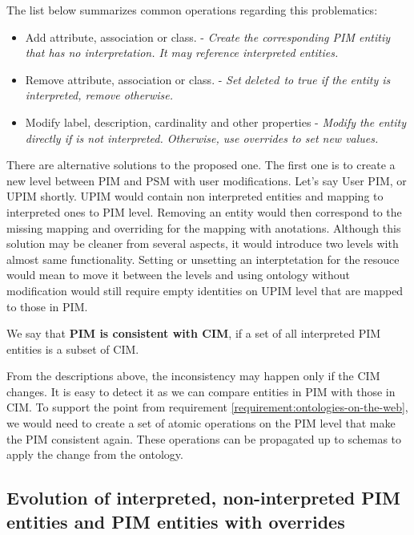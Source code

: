 The list below summarizes common operations regarding this problematics:

\begin{itemize}
    \item Add attribute, association or class. - \textit{Create the corresponding PIM entitiy that has no interpretation. It may reference interpreted entities.}
    \item Remove attribute, association or class. - \textit{Set $deleted$ to true if the entity is interpreted, remove otherwise.}
    \item Modify label, description, cardinality and other properties - \textit{Modify the entity directly if is not interpreted. Otherwise, use overrides to set new values.}
\end{itemize}

\bigskip

There are alternative solutions to the proposed one. The first one is to create a new level between PIM and PSM with user modifications. Let's say User PIM, or UPIM shortly. UPIM would contain non interpreted entities and mapping to interpreted ones to PIM level. Removing an entity would then correspond to the missing mapping and overriding for the mapping with anotations. Although this solution may be cleaner from several aspects, it would introduce two levels with almost same functionality. Setting or unsetting an interptetation for the resouce would mean to move it between the levels and using ontology without modification would still require empty identities on UPIM level that are mapped to those in PIM.

\bigskip

\begin{definition}[consistency]
    We say that \textbf{PIM is consistent with CIM}, if a set of all interpreted PIM entities is a subset of CIM.
\end{definition}

From the descriptions above, the inconsistency may happen only if the CIM changes. It is easy to detect it as we can compare entities in PIM with those in CIM. To support the  point from requirement \ref{requirement:ontologies-on-the-web}, we would need to create a set of atomic operations on the PIM level that make the PIM consistent again. These operations can be propagated up to schemas to apply the change from the ontology.

\newpage\subsection{Evolution of interpreted, non-interpreted PIM entities and PIM entities with overrides}

